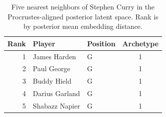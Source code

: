 \begin{table}[htbp]
  \centering\small
  \begin{tabular}{rllc}
    \toprule
    Rank & Player & Position & Archetype \\
    \midrule
    1 & James Harden & G & 1 \\
    2 & Paul George & G & 1 \\
    3 & Buddy Hield & G & 1 \\
    4 & Darius Garland & G & 1 \\
    5 & Shabazz Napier & G & 1 \\
    \bottomrule
  \end{tabular}
  \caption{Five nearest neighbors of Stephen Curry in the Procrustes-aligned posterior latent space. Rank is by posterior mean embedding distance.}
  \label{tab:Stephen_Curry_neighbors}
\end{table}


